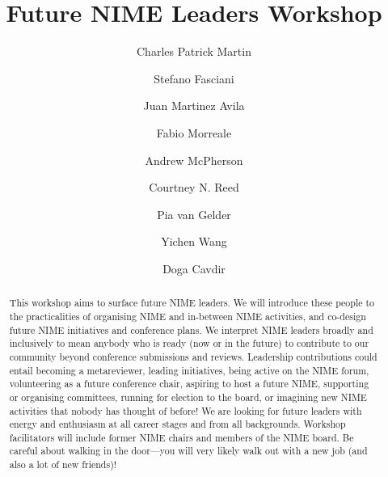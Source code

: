 \documentclass[acmsmall]{nimeart}
\begin{document}
\title{Future NIME Leaders Workshop}

\author{Charles Patrick Martin}

\author{Stefano Fasciani}

\author{Juan Martinez Avila}

\author{Fabio Morreale}

\author{Andrew McPherson}

\author{Courtney N. Reed}

\author{Pia van Gelder}

\author{Yichen Wang}

\author{Doga Cavdir}

\renewcommand{\shortauthors}{Martin et al.}

\begin{abstract}
This workshop aims to surface future NIME leaders. We will introduce these people to the practicalities of organising NIME and in-between NIME activities, and co-design future NIME initiatives and conference plans.
We interpret NIME leaders broadly and inclusively to mean anybody who is ready (now or in the future) to contribute to our community beyond conference submissions and reviews. Leadership contributions could entail becoming a metareviewer, leading initiatives, being active on the NIME forum, volunteering as a future conference chair, aspiring to host a future NIME, supporting or organising committees, running for election to the board, or imagining new NIME activities that nobody has thought of before! 
We are looking for future leaders with energy and enthusiasm at all career stages and from all backgrounds. 
Workshop facilitators will include former NIME chairs and members of the NIME board.
Be careful about walking in the door---you will very likely walk out with a new job (and also a lot of new friends)!
\end{abstract}
\end{document}
